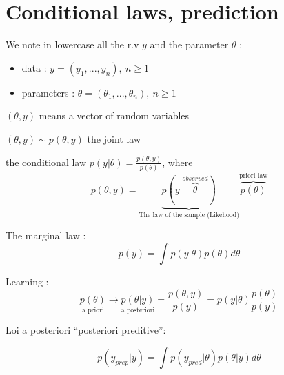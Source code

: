 \section{Conditional laws, prediction}

We note in lowercase all the r.v $y$ and the parameter $\theta$
:
\begin{itemize}
\item data : $y=(y_{1},...,y_{n}),\ n\geqslant1$
\item parameters : $\theta=(\theta_{1},...,\theta_{n}),\ n\geq1$
\end{itemize}
\begin{de}

$(\theta,y)$ means a vector of random variables

$(\theta,y)\sim p(\theta,y)$ the joint law

\end{de}

the conditional law $p(y|\theta)=\frac{p(\theta,y)}{p(\theta)}$,
where 
\[
p(\theta,y)=\underbrace{p(y|\overbrace{\theta}^{observed})}_{\text{The law of the sample (Likehood)}}\overbrace{p(\theta)}^{\text{priori law}}
\]
 

The marginal law : 
\[
p(y)=\int p(y|\theta)p(\theta)d\theta
\]


Learning : 
\[
\underset{\text{a priori}}{p(\theta)}\longrightarrow\underset{\text{a posteriori}}{p(\theta|y)}=\frac{p(\theta,y)}{p(y)}=p(y|\theta)\frac{p(\theta)}{p(y)}
\]


Loi a posteriori ``posteriori preditive'':

\[
p(y_{prep}|y)=\int p(y_{pred}|\theta)p(\theta|y)d\theta
\]

